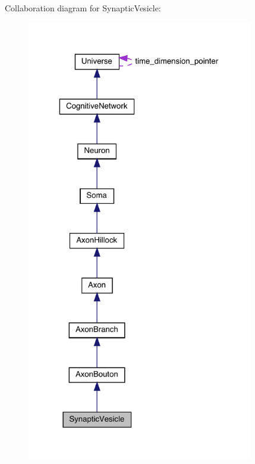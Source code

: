 Collaboration diagram for Synaptic\+Vesicle\+:
\nopagebreak
\begin{figure}[H]
\begin{center}
\leavevmode
\includegraphics[height=550pt]{class_synaptic_vesicle__coll__graph}
\end{center}
\end{figure}

